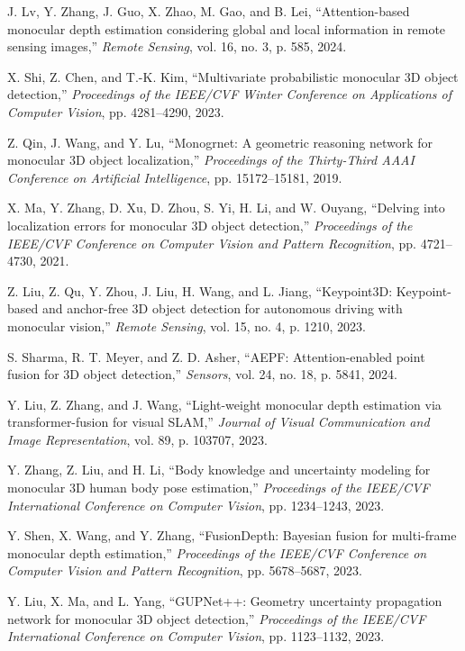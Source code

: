 \documentclass[12pt,oneside]{book}
\begin{document}
\begin{thebibliography}{99}
J. Lv, Y. Zhang, J. Guo, X. Zhao, M. Gao, and B. Lei,
``Attention-based monocular depth estimation considering global and local information in remote sensing images,''
\emph{Remote Sensing}, vol. 16, no. 3, p. 585, 2024.

X. Shi, Z. Chen, and T.-K. Kim,
``Multivariate probabilistic monocular 3D object detection,''
\emph{Proceedings of the IEEE/CVF Winter Conference on Applications of Computer Vision}, pp. 4281--4290, 2023.

Z. Qin, J. Wang, and Y. Lu,
``Monogrnet: A geometric reasoning network for monocular 3D object localization,''
\emph{Proceedings of the Thirty-Third AAAI Conference on Artificial Intelligence}, pp. 15172--15181, 2019.

X. Ma, Y. Zhang, D. Xu, D. Zhou, S. Yi, H. Li, and W. Ouyang,
``Delving into localization errors for monocular 3D object detection,''
\emph{Proceedings of the IEEE/CVF Conference on Computer Vision and Pattern Recognition}, pp. 4721--4730, 2021.

Z. Liu, Z. Qu, Y. Zhou, J. Liu, H. Wang, and L. Jiang,
``Keypoint3D: Keypoint-based and anchor-free 3D object detection for autonomous driving with monocular vision,''
\emph{Remote Sensing}, vol. 15, no. 4, p. 1210, 2023.

S. Sharma, R. T. Meyer, and Z. D. Asher,
``AEPF: Attention-enabled point fusion for 3D object detection,''
\emph{Sensors}, vol. 24, no. 18, p. 5841, 2024.

Y. Liu, Z. Zhang, and J. Wang,
``Light-weight monocular depth estimation via transformer-fusion for visual SLAM,''
\emph{Journal of Visual Communication and Image Representation}, vol. 89, p. 103707, 2023.

Y. Zhang, Z. Liu, and H. Li,
``Body knowledge and uncertainty modeling for monocular 3D human body pose estimation,''
\emph{Proceedings of the IEEE/CVF International Conference on Computer Vision}, pp. 1234--1243, 2023.

Y. Shen, X. Wang, and Y. Zhang,
``FusionDepth: Bayesian fusion for multi-frame monocular depth estimation,''
\emph{Proceedings of the IEEE/CVF Conference on Computer Vision and Pattern Recognition}, pp. 5678--5687, 2023.

Y. Liu, X. Ma, and L. Yang,
``GUPNet++: Geometry uncertainty propagation network for monocular 3D object detection,''
\emph{Proceedings of the IEEE/CVF International Conference on Computer Vision}, pp. 1123--1132, 2023.


\end{thebibliography}
\end{document}
